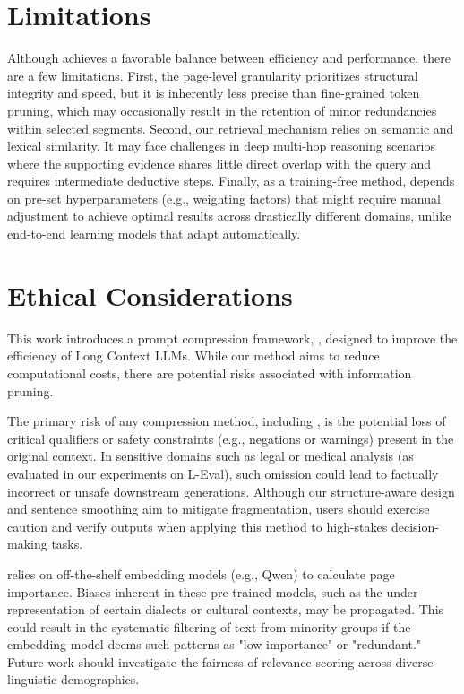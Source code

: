\documentclass[11pt]{article}
\newcommand{\ours}{\text{BEAVER}\xspace}
\begin{document}
\section*{Limitations}
Although \ours achieves a favorable balance between efficiency and performance, there are a few limitations.
First, the page-level granularity prioritizes structural integrity and speed, but it is inherently less precise than fine-grained token pruning, which may occasionally result in the retention of minor redundancies within selected segments.
Second, our retrieval mechanism relies on semantic and lexical similarity. It may face challenges in deep multi-hop reasoning scenarios where the supporting evidence shares little direct overlap with the query and requires intermediate deductive steps.
Finally, as a training-free method, \ours depends on pre-set hyperparameters (e.g., weighting factors) that might require manual adjustment to achieve optimal results across drastically different domains, unlike end-to-end learning models that adapt automatically.

\section*{Ethical Considerations}
This work introduces a prompt compression framework, \ours, designed to improve the efficiency of Long Context LLMs. While our method aims to reduce computational costs, there are potential risks associated with information pruning.

The primary risk of any compression method, including \ours, is the potential loss of critical qualifiers or safety constraints (e.g., negations or warnings) present in the original context. In sensitive domains such as legal or medical analysis (as evaluated in our experiments on L-Eval), such omission could lead to factually incorrect or unsafe downstream generations. Although our structure-aware design and sentence smoothing aim to mitigate fragmentation, users should exercise caution and verify outputs when applying this method to high-stakes decision-making tasks.

\ours relies on off-the-shelf embedding models (e.g., Qwen) to calculate page importance. Biases inherent in these pre-trained models, such as the under-representation of certain dialects or cultural contexts, may be propagated. This could result in the systematic filtering of text from minority groups if the embedding model deems such patterns as "low importance" or "redundant." Future work should investigate the fairness of relevance scoring across diverse linguistic demographics.
\end{document}
